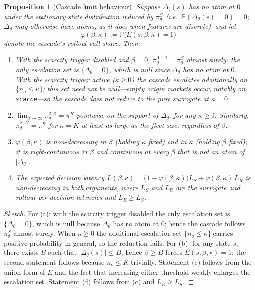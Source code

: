 \documentclass[11pt]{article}
\newtheorem{proposition}{Proposition}
\begin{document}
\begin{proposition}[Cascade limit behaviour]
\label{prop:cascade}
Suppose $\Delta_\theta(s)$ has no atom at $0$ under the stationary state
distribution induced by $\pi^{S}_\theta$ (i.e.\ $\mathbb{P}(\Delta_\theta(s) = 0) = 0$;
$\Delta_\theta$ may otherwise have atoms, as it does when features are
discrete), and let
\begin{equation}
  \varphi(\beta, \kappa)
  := \mathbb{P}\bigl(E(s; \beta, \kappa) = 1\bigr)
\end{equation}
denote the cascade's rollout-call share. Then:
\begin{enumerate}
  \item[(a)] With the scarcity trigger disabled and $\beta = 0$,
  $\pi^{0, -1}_\theta = \pi^{S}_\theta$ almost surely: the only escalation
  set is $\{\Delta_\theta = 0\}$, which is null since $\Delta_\theta$ has
  no atom at $0$. With the scarcity trigger active ($\kappa \geq 0$) the
  cascade escalates additionally on $\{n_o \leq \kappa\}$; this set need
  not be null---empty origin markets occur, notably on \texttt{scarce}---so
  the cascade does \emph{not} reduce to the pure surrogate at $\kappa = 0$.
  \item[(b)] $\lim_{\beta \to \infty} \pi^{\beta, \kappa}_\theta = \pi^{R}$
  pointwise on the support of $\Delta_\theta$, for any $\kappa \geq 0$.
  Similarly, $\pi^{\beta, K}_\theta = \pi^{R}$ for $\kappa = K$ at least
  as large as the fleet size, regardless of $\beta$.
  \item[(c)] $\varphi(\beta, \kappa)$ is non-decreasing in $\beta$
  (holding $\kappa$ fixed) and in $\kappa$ (holding $\beta$ fixed); it
  is right-continuous in $\beta$ and continuous at every $\beta$ that is
  not an atom of $|\Delta_\theta|$.
  \item[(d)] The expected decision latency
  $L(\beta, \kappa) = \bigl(1 - \varphi(\beta, \kappa)\bigr) L_S
  + \varphi(\beta, \kappa)\, L_R$ is non-decreasing in both arguments,
  where $L_S$ and $L_R$ are the surrogate and rollout per-decision
  latencies and $L_R \geq L_S$.
\end{enumerate}
\end{proposition}

\begin{proof}[Sketch]
For (a): with the scarcity trigger disabled the only escalation set is
$\{\Delta_\theta = 0\}$, which is null because $\Delta_\theta$ has no atom
at $0$; hence the cascade follows $\pi^{S}_\theta$ almost surely. When
$\kappa \geq 0$ the additional escalation set $\{n_o \leq \kappa\}$ carries
positive probability in general, so the reduction fails. For (b): for any state $s$, there
exists $B$ such that $|\Delta_\theta(s)| \leq B$, hence $\beta \geq B$
forces $E(s; \beta, \kappa) = 1$; the second statement follows because
$n_o \leq K$ trivially. Statement (c) follows from the union form of
$E$ and the fact that increasing either threshold weakly enlarges the
escalation set. Statement (d) follows from (c) and $L_R \geq L_S$.
\end{proof}
\end{document}
